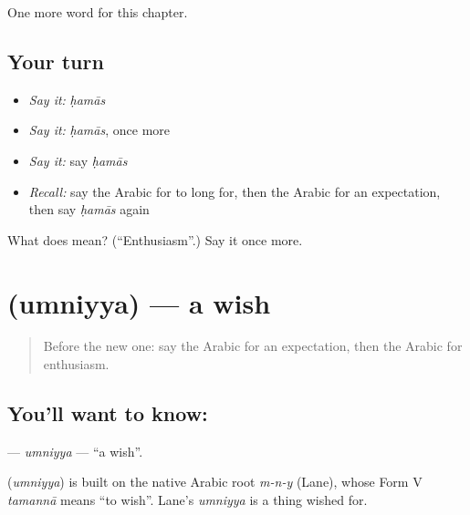 \begin{grammarlens}[title={What you've built}]
One more word for this chapter.
\end{grammarlens}

\subsection*{Your turn}
\begin{itemize}
\raggedright
  \item \emph{Say it:} \emph{ḥamās}
  \item \emph{Say it:} \emph{ḥamās}, once more
  \item \emph{Say it:} say \emph{ḥamās}
  \item \emph{Recall:} say the Arabic for to long for, then the Arabic for an expectation, then say \emph{ḥamās} again
\end{itemize}

\begin{tcolorbox}[breakable,colback=teal!4,colframe=teal!35!black,title={Before you move on}]
What does  mean? (\textquotedblleft{}Enthusiasm\textquotedblright{}.) Say it once more.
\end{tcolorbox}
\section[\texorpdfstring{\ar{أمنية} (umniyya)}{أمنية (umniyya)}]{ (umniyya) — a wish}

\label{lesson:AR-C111-umniyya}



\begin{quote}
Before the new one: say the Arabic for an expectation, then the Arabic for enthusiasm.
\end{quote}

\subsection*{You'll want to know: }
\textbf{} — \emph{umniyya} — \textquotedblleft{}a wish\textquotedblright{}.

\begin{cousinweb}
\textbf{} (\emph{umniyya}) is built on the native Arabic root \emph{m-n-y} (Lane), whose Form V \emph{tamannā} means \textquotedblleft{}to wish\textquotedblright{}. Lane's \emph{umniyya} is a thing wished for.
\end{cousinweb}


